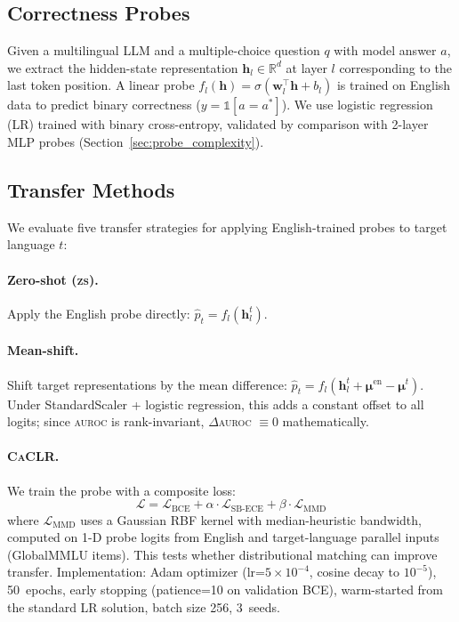 \documentclass[11pt,a4paper]{article}
\newcommand{\aur}{\textsc{auroc}}
\newcommand{\zs}{\textsc{zs}}
\newcommand{\caclr}{\textsc{CaCLR}}
\begin{document}
\subsection{Correctness Probes}

Given a multilingual LLM and a multiple-choice question $q$ with model answer $a$, we extract the hidden-state representation $\mathbf{h}_l \in \mathbb{R}^d$ at layer $l$ corresponding to the last token position. A linear probe $f_l(\mathbf{h}) = \sigma(\mathbf{w}_l^\top \mathbf{h} + b_l)$ is trained on English data to predict binary correctness ($y = \mathbb{1}[a = a^*]$). We use logistic regression (LR) trained with binary cross-entropy, validated by comparison with 2-layer MLP probes (Section~\ref{sec:probe_complexity}).

\subsection{Transfer Methods}

We evaluate five transfer strategies for applying English-trained probes to target language $t$:

\paragraph{Zero-shot (\zs{}).} Apply the English probe directly: $\hat{p}_t = f_l(\mathbf{h}_l^t)$.

\paragraph{Mean-shift.} Shift target representations by the mean difference: $\hat{p}_t = f_l(\mathbf{h}_l^t + \boldsymbol{\mu}^{\text{en}} - \boldsymbol{\mu}^t)$. Under StandardScaler + logistic regression, this adds a constant offset to all logits; since \aur{} is rank-invariant, $\Delta$\aur{} $\equiv 0$ mathematically.

\paragraph{\caclr{}.} We train the probe with a composite loss:
\begin{equation}
\mathcal{L} = \mathcal{L}_{\text{BCE}} + \alpha \cdot \mathcal{L}_{\text{SB-ECE}} + \beta \cdot \mathcal{L}_{\text{MMD}}
\end{equation}
where $\mathcal{L}_{\text{MMD}}$ uses a Gaussian RBF kernel with median-heuristic bandwidth, computed on 1-D probe logits from English and target-language parallel inputs (GlobalMMLU items). This tests whether distributional matching can improve transfer. Implementation: Adam optimizer (lr=$5{\times}10^{-4}$, cosine decay to $10^{-5}$), 50~epochs, early stopping (patience=10 on validation BCE), warm-started from the standard LR solution, batch size 256, 3~seeds.
\end{document}
